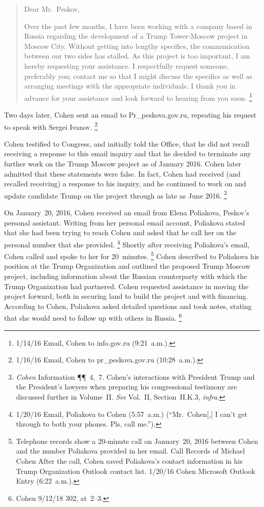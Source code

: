 \begin{quote}
Dear Mr.~Peskov,

Over the past few months, I have been working with a company based in Russia regarding the development of a Trump Tower-Moscow project in Moscow City.
Without getting into lengthy specifics, the communication between our two sides has stalled.
As this project is too important, I am hereby requesting your assistance.
I respectfully request someone, preferably you; contact me so that I might discuss the specifics as well as arranging meetings with the appropriate individuals.
I thank you in advance for your assistance and look forward to hearing from you soon.%
\footnote{1/14/16 Email, Cohen to info\@prpress.gov.ru (9:21~a.m.).}
\end{quote}

Two days later, Cohen sent an email to Pr\_peskova\@prpress.gov.ru, repeating his request to speak with Sergei Ivanov.%
\footnote{1/16/16 Email, Cohen to pr\_peskova\@prpress.gov.ru (10:28~a.m.).}

Cohen testified to Congress, and initially told the Office, that he did not recall receiving a response to this email inquiry and that he decided to terminate any further work on the Trump Moscow project as of January 2016.
Cohen later admitted that these statements were false.
In fact, Cohen had received (and recalled receiving) a response to his inquiry, and he continued to work on and update candidate Trump on the project through as late as June 2016.%
\footnote{\textit{Cohen} Information \P\P~4,~7.
Cohen's interactions with President Trump and the President's lawyers when preparing his congressional testimony are discussed further in Volume~II\null.
\textit{See} Vol.~II, Section~II.K.3, \textit{infra}.}

On January~20, 2016, Cohen received an email from Elena Poliakova, Peskov's personal assistant.
Writing from her personal email account, Poliakova stated that she had been trying to reach Cohen and asked that he call her on the personal number that she provided.%
\footnote{1/20/16 Email, Poliakova to Cohen (5:57~a.m.)
(``Mr.~Cohen[,] I can't get through to both your phones. Pls, call me.'').}
Shortly after receiving Poliakova's email, Cohen called and spoke to her for 20~minutes.%
\footnote{Telephone records show a 20-minute call on January~20, 2016 between Cohen and the number Poliakova provided in her email.
Call Records of Michael Cohen 
After the call, Cohen saved Poliakova's contact information in his Trump Organization Outlook contact list.
1/20/16 Cohen Microsoft Outlook Entry (6:22~a.m.).}
Cohen described to Poliakova his position at the Trump Organization and outlined the proposed Trump Moscow project, including information about the Russian counterparty with which the Trump Organization had partnered.
Cohen requested assistance in moving the project forward, both in securing land to build the project and with financing.
According to Cohen, Poliakova asked detailed questions and took notes, stating that she would need to follow up with others in Russia.%
\footnote{Cohen 9/12/18 302, at~2--3.}

